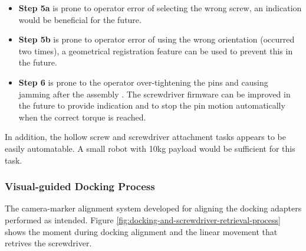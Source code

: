 \begin{itemize}
    \item \textbf{Step 5a} is prone to operator error of selecting the wrong screw, an indication would be beneficial for the future.
    \item \textbf{Step 5b} is prone to operator error of using the wrong orientation (occurred two times), a geometrical registration feature can be used to prevent this in the future.
    \item \textbf{Step 6} is prone to the operator over-tightening the pins and causing jamming after the assembly . The screwdriver firmware can be improved in the future to provide indication and to stop the pin motion automatically when the correct torque is reached.
\end{itemize}

In addition, the hollow screw and screwdriver attachment tasks appears to be easily automatable. A small robot with 10kg payload would be sufficient for this task.

\subsubsection{Visual-guided Docking Process}
\label{subsubsection:exploration-4-visual-guided-docking-process}

The camera-marker alignment system developed for aligning the docking adapters performed as intended. Figure \ref{fig:docking-and-screwdriver-retrieval-process} shows the moment during docking alignment and the linear movement that retrives the screwdriver.


